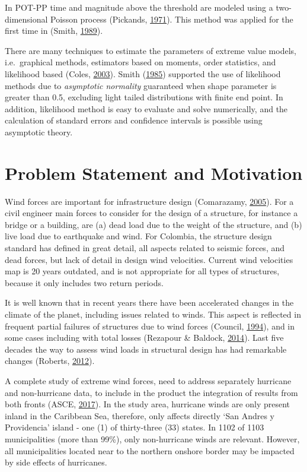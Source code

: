\documentclass[12pt,twoside]{reedthesis}
\begin{document}
In POT-PP time and magnitude above the threshold are modeled using a two-dimensional Poisson process (Pickands, \protect\hyperlink{ref-Pickands1971}{1971}). This method was applied for the first time in (Smith, \protect\hyperlink{ref-Smith1989}{1989}).

There are many techniques to estimate the parameters of extreme value models, i.e.~graphical methods, estimators based on moments, order statistics, and likelihood based (Coles, \protect\hyperlink{ref-Coles2003}{2003}). Smith (\protect\hyperlink{ref-Smith1985}{1985}) supported the use of likelihood methods due to \emph{asymptotic normality} guaranteed when shape parameter is greater than 0.5, excluding light tailed distributions with finite end point. In addition, likelihood method is easy to evaluate and solve numerically, and the calculation of standard errors and confidence intervals is possible using asymptotic theory.

\hypertarget{problem-statement-and-motivation}{%
\section{Problem Statement and Motivation}\label{problem-statement-and-motivation}}

Wind forces are important for infrastructure design (Comarazamy, \protect\hyperlink{ref-windeffects}{2005}). For a civil engineer main forces to consider for the design of a structure, for instance a bridge or a building, are (a) dead load due to the weight of the structure, and (b) live load due to earthquake and wind. For Colombia, the structure design standard has defined in great detail, all aspects related to seismic forces, and dead forces, but lack of detail in design wind velocities. Current wind velocities map is 20 years outdated, and is not appropriate for all types of structures, because it only includes two return periods.

It is well known that in recent years there have been accelerated changes in the climate of the planet, including issues related to winds. This aspect is reflected in frequent partial failures of structures due to wind forces (Council, \protect\hyperlink{ref-winddamage}{1994}), and in some cases including with total losses (Rezapour \& Baldock, \protect\hyperlink{ref-Rezapour2014}{2014}). Last five decades the way to assess wind loads in structural design has had remarkable changes (Roberts, \protect\hyperlink{ref-Roberts2012}{2012}).

A complete study of extreme wind forces, need to address separately hurricane and non-hurricane data, to include in the product the integration of results from both fronts (ASCE, \protect\hyperlink{ref-Asce2017}{2017}). In the study area, hurricane winds are only present inland in the Caribbean Sea, therefore, only affects directly `San Andres y Providencia' island - one (1) of thirty-three (33) states. In 1102 of 1103 municipalities (more than 99\%), only non-hurricane winds are relevant. However, all municipalities located near to the northern onshore border may be impacted by side effects of hurricanes.
\end{document}
